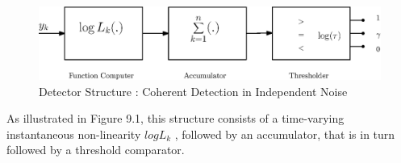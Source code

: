 \documentclass[12pt]{report}
\begin{document}
	
	\begin{figure}[h]
		\centering
		\includegraphics[scale=1.0]{Figures/CohDetector.eps}
		\caption{Detector Structure : Coherent Detection in Independent Noise}
		\label{fig:CohDetector}
	\end{figure}
	
	\noindent As illustrated in Figure 9.1, this structure consists of a time-varying instantaneous non-linearity $log L_k$ , followed by an accumulator, that is in turn followed by a threshold comparator.
	
\end{document}
